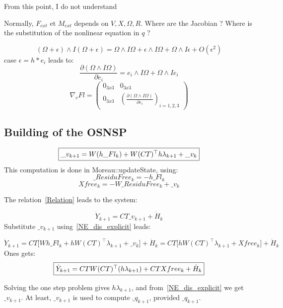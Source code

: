 \begin{ndrva}
  From this point, I do not understand

  Normally, $F_{ext}$ et $M_{ext}$ depends on $V,X,\Omega, R$. Where are the Jacobian ?  Where  is the substitution of the nonlinear equation in $q$ ?
\end{ndrva}


\[ (\Omega+\epsilon)  \wedge I(\Omega+\epsilon)=  \Omega  \wedge I\Omega + \epsilon \wedge I \Omega +  \Omega  \wedge I \epsilon + O(\epsilon ^2)\]
case $\epsilon = h*e_i$ leads to:
\begin{equation}
  \label{eq:NE_nablaFL1}
  \frac{\partial (\Omega \wedge I\Omega)}{\partial e_i}=e_i\wedge I\Omega+\Omega \wedge Ie_i
  \end{equation}
\[\nabla _v Fl = \left(\begin{array}{cc}
0_{3x3}&0_{3x3}\\
0_{3x3}&\left(\frac{\partial (\Omega \wedge I\Omega)}{\partial e_i}\right)_{i=1,2,3}
\end{array}\right)\]

\subsection{Building of the OSNSP}

\begin{equation}
  \label{NE_dis_explicit}
  \fbox{$
   \_v_{k+1}=
   W (h \_Fl_k)+
   W (CT)^\top h\lambda _{k+1}+ \_v_k
   $}
  \end{equation}
  This computation is done in Moreau::updateState, using:
  \[\_ResiduFree_k = -h \_Fl_k\]
  \[Xfree_k = -W \_ResiduFree_k + \_v_k\]

The relation~\ref{Relation} leads to the system:

\[\dot Y _{k+1}= C T \_v_{k+1} + \dot H _{k} \]
Substitute $  \_v_{k+1} $ using~\ref{NE_dis_explicit} leads:

\[\dot Y _{k+1}= C T \lbrack W h\_Fl_k+
   hW(CT)^\top \lambda _{k+1}+ \_v_k \rbrack
   + \dot H _{k} = C T \lbrack  hW (CT)^\top \lambda _{k+1}+ Xfree_k \rbrack
   + \dot H _{k}\]
Ones gets:
\[\fbox{$
\dot Y _{k+1}= C T W (CT)^\top (h\lambda _{k+1}) + CT Xfree_k +\dot H _{k} $}\]


Solving the one step problem gives $h\lambda _{k+1}$, and from~\ref{NE_dis_explicit} we get
$ \_v_{k+1} $. At least, $ \_v_{k+1} $ is used to compute $\dot \_q_{k+1}$, provided $\_q_{k+1}$.

